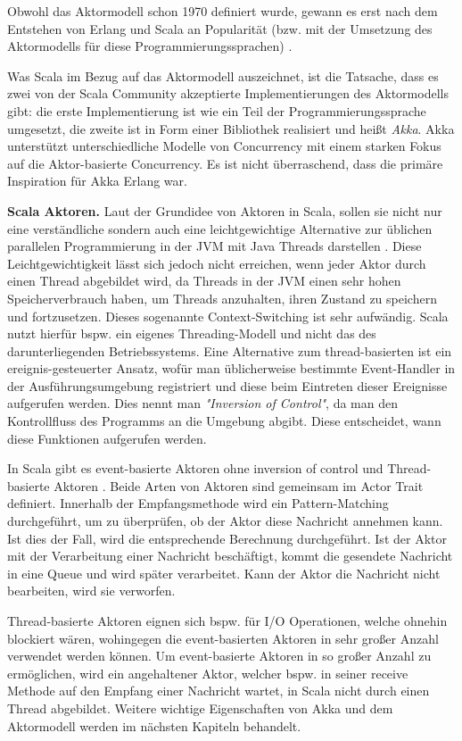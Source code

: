 Obwohl das Aktormodell schon 1970 definiert wurde, gewann es erst nach dem Entstehen von Erlang und Scala an Popularität (bzw. mit der Umsetzung des Aktormodells für diese Programmierungssprachen) \cite{Odersky04anoverview}.

Was Scala im Bezug auf das Aktormodell auszeichnet, ist die Tatsache, dass es zwei von der Scala Community akzeptierte Implementierungen des Aktormodells gibt: die erste Implementierung ist wie ein Teil der Programmierungssprache umgesetzt, die zweite ist in Form einer Bibliothek realisiert und heißt \textit{Akka}. Akka unterstützt unterschiedliche Modelle von Concurrency mit einem starken Fokus auf die Aktor-basierte Concurrency. Es ist nicht überraschend, dass die primäre Inspiration für Akka Erlang war.


\textbf{Scala Aktoren.} Laut der Grundidee von Aktoren in Scala, sollen sie nicht nur eine verständliche sondern auch eine leichtgewichtige Alternative zur üblichen parallelen Programmierung in der JVM mit Java Threads darstellen \cite{Odersky04anoverview}. Diese Leichtgewichtigkeit lässt sich jedoch nicht erreichen, wenn jeder Aktor durch einen Thread abgebildet wird, da Threads in der JVM einen sehr hohen Speicherverbrauch haben, um Threads anzuhalten, ihren Zustand zu speichern und fortzusetzen. Dieses sogenannte Context-Switching ist sehr aufwändig. Scala nutzt hierfür bspw. ein eigenes Threading-Modell und nicht das des darunterliegenden Betriebssystems. Eine Alternative zum thread-basierten ist ein ereignis-gesteuerter Ansatz, wofür man üblicherweise bestimmte Event-Handler in der Ausführungsumgebung registriert und diese beim Eintreten dieser Ereignisse aufgerufen werden. Dies nennt man \textit{"Inversion of Control"}, da man den Kontrollfluss des Programms an die Umgebung abgibt. Diese entscheidet, wann diese Funktionen aufgerufen werden.

In Scala gibt es event-basierte Aktoren ohne inversion of control und Thread-basierte Aktoren \cite{scalaactors}. Beide Arten von Aktoren sind gemeinsam im Actor Trait definiert. Innerhalb der Empfangsmethode wird ein Pattern-Matching durchgeführt, um zu überprüfen, ob der Aktor diese Nachricht annehmen kann. Ist dies der Fall, wird die entsprechende Berechnung durchgeführt. Ist der Aktor mit der Verarbeitung einer Nachricht beschäftigt, kommt die gesendete Nachricht in eine Queue und wird später verarbeitet. Kann der Aktor die Nachricht nicht bearbeiten, wird sie verworfen.

Thread-basierte Aktoren eignen sich bspw. für I/O Operationen, welche ohnehin blockiert wären, wohingegen die event-basierten Aktoren in sehr großer Anzahl verwendet werden können. Um event-basierte Aktoren in so großer Anzahl zu ermöglichen, wird ein angehaltener Aktor, welcher bspw. in seiner receive Methode auf den Empfang einer Nachricht wartet, in Scala nicht durch einen Thread abgebildet. Weitere wichtige Eigenschaften von Akka und dem Aktormodell werden im nächsten Kapiteln behandelt.

